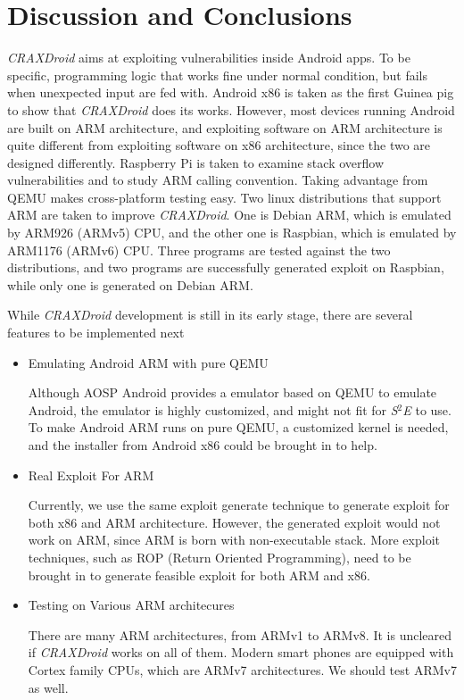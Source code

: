 \chapter{Discussion and Conclusions}

\emph{CRAXDroid} aims at exploiting vulnerabilities inside Android apps. To be
specific, programming logic that works fine under normal condition, but fails
when unexpected input are fed with. Android x86 is taken as the first Guinea
pig to show that \emph{CRAXDroid} does its works. However, most devices running
Android are built on ARM architecture, and exploiting software on ARM
architecture is quite different from exploiting software on x86 architecture,
since the two are designed differently. Raspberry Pi is taken to examine stack
overflow vulnerabilities and to study ARM calling convention. Taking advantage
from QEMU makes cross-platform testing easy. Two linux distributions that
support ARM are taken to improve \emph{CRAXDroid}. One is Debian ARM, which is
emulated by ARM926 (ARMv5) CPU, and the other one is Raspbian, which is
emulated by ARM1176 (ARMv6) CPU. Three programs are tested against the two
distributions, and two programs are successfully generated exploit on Raspbian,
while only one is generated on Debian ARM.

While \emph{CRAXDroid} development is still in its early stage, there are
several features to be implemented next

\begin{itemize}

\item{Emulating Android ARM with pure QEMU}

Although AOSP Android provides a emulator based on QEMU to emulate Android, the
emulator is highly customized, and might not fit for \emph{S$^{2}$E} to use. To
make Android ARM runs on pure QEMU, a customized kernel is needed, and the
installer from Android x86 could be brought in to help.

\item{Real Exploit For ARM}

Currently, we use the same exploit generate technique to generate exploit for
both x86 and ARM architecture. However, the generated exploit would not work on
ARM, since ARM is born with non-executable stack. More exploit techniques, such
as ROP (Return Oriented Programming), need to be brought in to generate
feasible exploit for both ARM and x86.

\item{Testing on Various ARM architecures}

There are many ARM architectures, from ARMv1 to ARMv8. It is uncleared if
\emph{CRAXDroid} works on all of them. Modern smart phones are equipped with
Cortex family CPUs, which are ARMv7 architectures. We should test ARMv7 as
well.

\end{itemize}
